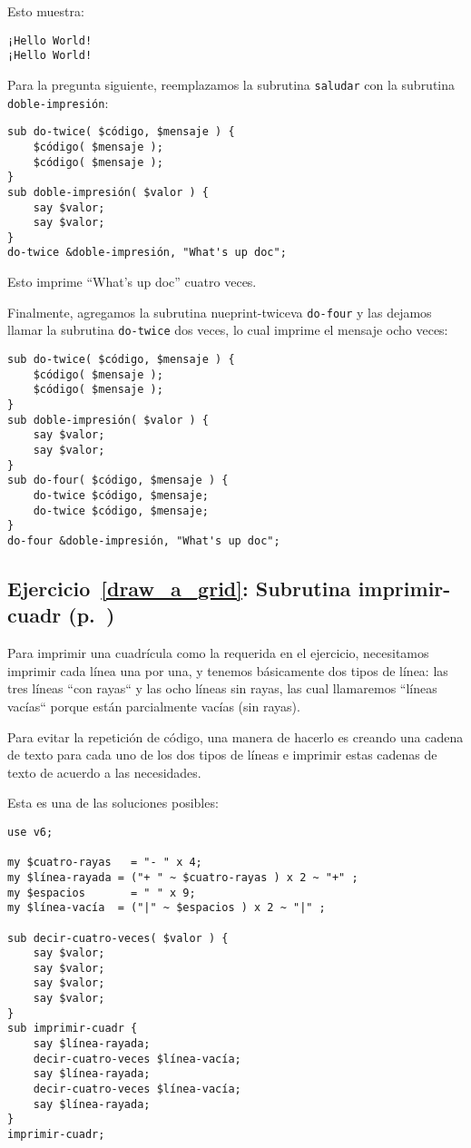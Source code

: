 Esto muestra:

\begin{verbatim}
¡Hello World!
¡Hello World!
\end{verbatim}

Para la pregunta siguiente, reemplazamos la subrutina {\tt saludar}
con la subrutina {\tt doble-impresión}:

\begin{verbatim}
sub do-twice( $código, $mensaje ) {
    $código( $mensaje ); 
    $código( $mensaje );
}
sub doble-impresión( $valor ) {
    say $valor;
    say $valor;
}
do-twice &doble-impresión, "What's up doc";
\end{verbatim}

Esto imprime ``What's up doc'' cuatro veces.

Finalmente, agregamos la subrutina nueprint-twiceva {\tt do-four} 
y las dejamos llamar la subrutina {\tt do-twice} dos veces,
lo cual imprime el mensaje ocho veces:

\begin{verbatim}
sub do-twice( $código, $mensaje ) {
	$código( $mensaje ); 
	$código( $mensaje );
}
sub doble-impresión( $valor ) {
	say $valor;
	say $valor;
}
sub do-four( $código, $mensaje ) {
    do-twice $código, $mensaje;
    do-twice $código, $mensaje;
}
do-four &doble-impresión, "What's up doc";
\end{verbatim}

\subsection{Ejercicio~\ref{draw_a_grid}: Subrutina imprimir-cuadr (p.~\pageref{draw_a_grid})}
\label{sol_draw_a_grid}

Para imprimir una cuadrícula como la requerida en el ejercicio,
necesitamos imprimir cada línea una por una, y tenemos básicamente
dos tipos de línea: las tres líneas ``con rayas`` y las ocho líneas
sin rayas, las cual llamaremos ``líneas vacías`` porque están 
parcialmente vacías (sin rayas).

Para evitar la repetición de código, una manera de hacerlo es 
creando una cadena de texto para cada uno de los dos tipos de líneas
e imprimir estas cadenas de texto de acuerdo a las necesidades.

Esta es una de las soluciones posibles:

\begin{verbatim}
use v6;

my $cuatro-rayas   = "- " x 4;
my $línea-rayada = ("+ " ~ $cuatro-rayas ) x 2 ~ "+" ;
my $espacios       = " " x 9;
my $línea-vacía  = ("|" ~ $espacios ) x 2 ~ "|" ;

sub decir-cuatro-veces( $valor ) {
    say $valor;
    say $valor;
    say $valor;
    say $valor;
}
sub imprimir-cuadr {
    say $línea-rayada;
    decir-cuatro-veces $línea-vacía;
    say $línea-rayada;
    decir-cuatro-veces $línea-vacía;
    say $línea-rayada;
}
imprimir-cuadr;
\end{verbatim}

